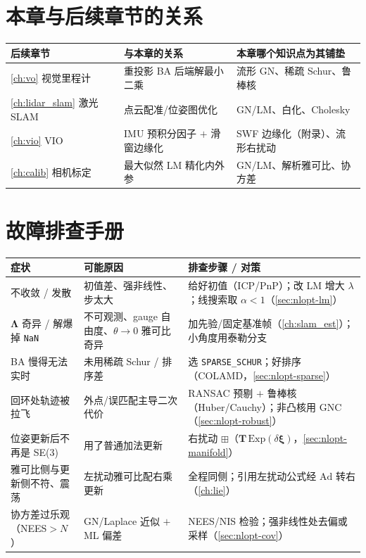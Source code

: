 \section*{本章与后续章节的关系}
\begin{table}[H]\centering\small
\begin{tabular}{lll}
\toprule
后续章节 & 与本章的关系 & 本章哪个知识点为其铺垫 \\
\midrule
\cref{ch:vo} 视觉里程计 & 重投影 BA 后端解最小二乘 & 流形 GN、稀疏 Schur、鲁棒核 \\
\cref{ch:lidar_slam} 激光 SLAM & 点云配准/位姿图优化 & GN/LM、白化、Cholesky \\
\cref{ch:vio} VIO & IMU 预积分因子 $+$ 滑窗边缘化 & SWF 边缘化（附录）、流形右扰动 \\
\cref{ch:calib} 相机标定 & 最大似然 LM 精化内外参 & GN/LM、解析雅可比、协方差 \\
\bottomrule
\end{tabular}
\end{table}

\section*{故障排查手册}
\begin{table}[H]\centering\small
\begin{tabular}{p{} p{} p{}}
\toprule
症状 & 可能原因 & 排查步骤 / 对策 \\
\midrule
不收敛 / 发散 & 初值差、强非线性、步太大 & 给好初值（ICP/PnP）；改 LM 增大 $\lambda$；线搜索取 $\alpha<1$（\cref{sec:nlopt-lm}）\\
$\boldsymbol{\Lambda}$ 奇异 / 解爆掉 \texttt{NaN} & 不可观测、gauge 自由度、$\theta\to0$ 雅可比奇异 & 加先验/固定基准帧（\cref{ch:slam_est}）；小角度用泰勒分支 \\
BA 慢得无法实时 & 未用稀疏 Schur / 排序差 & 选 \texttt{SPARSE\_SCHUR}；好排序（COLAMD，\cref{sec:nlopt-sparse}）\\
回环处轨迹被拉飞 & 外点/误匹配主导二次代价 & RANSAC 预剔 $+$ 鲁棒核（Huber/Cauchy）；非凸核用 GNC（\cref{sec:nlopt-robust}）\\
位姿更新后不再是 SE(3) & 用了普通加法更新 & 右扰动 $\boxplus$（$\mathbf{T}\,\mathrm{Exp}(\delta\boldsymbol{\xi})$，\cref{sec:nlopt-manifold}）\\
雅可比侧与更新侧不符、震荡 & 左扰动雅可比配右乘更新 & 全程同侧；引用左扰动公式经 $\mathrm{Ad}$ 转右（\cref{ch:lie}）\\
协方差过乐观（NEES$>N$）& GN/Laplace 近似 $+$ ML 偏差 & NEES/NIS 检验；强非线性处去偏或采样（\cref{sec:nlopt-cov}）\\
\bottomrule
\end{tabular}
\end{table}

